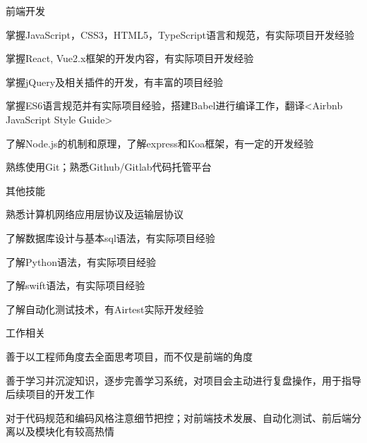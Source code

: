 \begin{cventries}
  \cventry
    {前端开发}
    {}
    {}
    {}
    {
      \begin{cvitems}
        \item {掌握JavaScript，CSS3，HTML5，TypeScript语言和规范，有实际项目开发经验}
        \item {掌握React, Vue2.x框架的开发内容，有实际项目开发经验}
        \item {掌握jQuery及相关插件的开发，有丰富的项目经验}
        \item {掌握ES6语言规范并有实际项目经验，搭建Babel进行编译工作，翻译<Airbnb JavaScript Style Guide>}
        \item {了解Node.js的机制和原理，了解express和Koa框架，有一定的开发经验}
        \item {熟练使用Git；熟悉Github/Gitlab代码托管平台}
      \end{cvitems}
    }
  \cventry
    {其他技能}
    {}
    {}
    {}
    {
      \begin{cvitems}
        \item {熟悉计算机网络应用层协议及运输层协议}
        \item {了解数据库设计与基本sql语法，有实际项目经验}
        \item {了解Python语法，有实际项目经验}
        \item {了解swift语法，有实际项目经验}
        \item {了解自动化测试技术，有Airtest实际开发经验}
      \end{cvitems}
    }
  \cventry
    {工作相关}
    {}
    {}
    {}
    {
      \begin{cvitems}
        \item {善于以工程师角度去全面思考项目，而不仅是前端的角度}
        \item {善于学习并沉淀知识，逐步完善学习系统，对项目会主动进行复盘操作，用于指导后续项目的开发工作}
        \item {对于代码规范和编码风格注意细节把控；对前端技术发展、自动化测试、前后端分离以及模块化有较高热情}
      \end{cvitems}
    }
\end{cventries}

